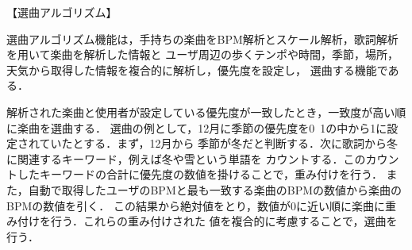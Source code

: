 【選曲アルゴリズム】
\par
選曲アルゴリズム機能は，手持ちの楽曲をBPM解析とスケール解析，歌詞解析を用いて楽曲を解析した情報と
ユーザ周辺の歩くテンポや時間，季節，場所，天気から取得した情報を複合的に解析し，優先度を設定し，
選曲する機能である．

\par
解析された楽曲と使用者が設定している優先度が一致したとき，一致度が高い順に楽曲を選曲する．
選曲の例として，12月に季節の優先度を0~1の中から1に設定されていたとする．まず，12月から
季節が冬だと判断する．次に歌詞から冬に関連するキーワード，例えば冬や雪という単語を
カウントする．このカウントしたキーワードの合計に優先度の数値を掛けることで，重み付けを行う．
また，自動で取得したユーザのBPMと最も一致する楽曲のBPMの数値から楽曲のBPMの数値を引く．
この結果から絶対値をとり，数値が0に近い順に楽曲に重み付けを行う．これらの重み付けされた
値を複合的に考慮することで，選曲を行う．

